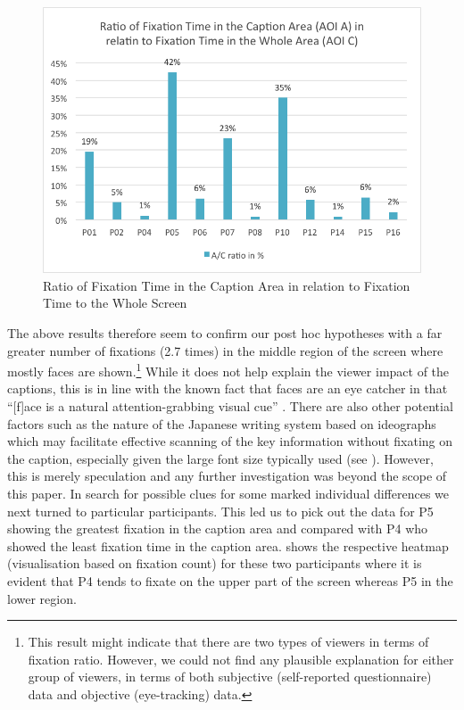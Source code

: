 \documentclass[output=paper]{langsci/langscibook}
\begin{document}
\begin{figure}
 \includegraphics[width=\textwidth]{figures/OHagan5.png}
\caption{Ratio of Fixation Time in the Caption Area in relation to Fixation Time to the Whole Screen}
\label{ohagan:fig:5}
\end{figure}


The above results therefore seem to confirm our post hoc hypotheses with a far greater number of fixations (2.7 times) in the middle region of the screen where mostly faces are shown.\footnote{ This result might indicate that there are two types of viewers in terms of fixation ratio. However, we could not find any plausible explanation for either group of viewers, in terms of both subjective (self-reported questionnaire) data and objective (eye-tracking) data.} While it does not help explain the viewer impact of the captions, this is in line with the known fact that faces are an eye catcher in that ``[f]ace is a natural attention-grabbing visual cue'' \citep[264]{perego2010}. There are also other potential factors such as the nature of the Japanese writing system based on ideographs which may facilitate effective scanning of the key information without fixating on the caption, especially given the large font size typically used (see ). However, this is merely speculation and any further investigation was beyond the scope of this paper. In search for possible clues for some marked individual differences we next turned to particular participants.  This led us to pick out the data for P5 showing the greatest fixation in the caption area and compared with P4 who showed the least fixation time in the caption area.   shows the respective heatmap (visualisation based on fixation count) for these two participants where it is evident that P4 tends to fixate on the upper part of the screen whereas P5 in the lower region.
\end{document}
